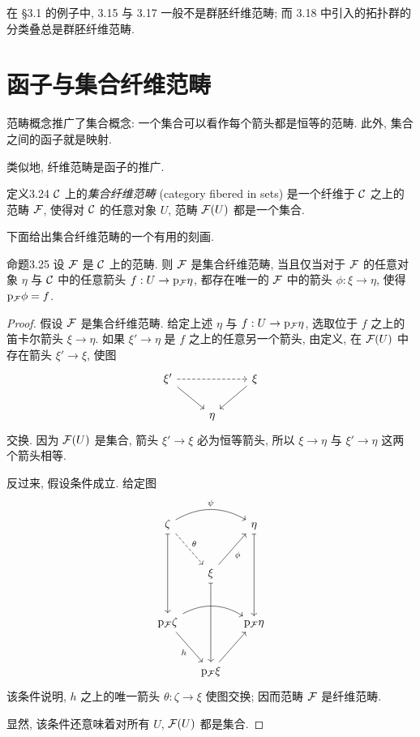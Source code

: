 在 \S3.1 的例子中, 3.15 与 3.17 一般不是群胚纤维范畴; 而 3.18 中引入的拓扑群的分类叠总是群胚纤维范畴.

\section{函子与集合纤维范畴}
\label{ch03:sec34}
范畴概念推广了集合概念: 一个集合可以看作每个箭头都是恒等的范畴. 此外, 集合之间的函子就是映射.

类似地, 纤维范畴是函子的推广.

\begin{origstatement}{定义}{3.24}\label{ch03:def324}
$\mathcal C$ 上的\emph{集合纤维范畴} (category fibered in sets) 是一个纤维于 $\mathcal C$ 之上的范畴 $\mathcal F$, 使得对 $\mathcal C$ 的任意对象 $U$, 范畴 $\mathcal F(U)$ 都是一个集合.
\end{origstatement}

下面给出集合纤维范畴的一个有用的刻画.

\begin{origstatement}{命题}{3.25}\label{ch03:prop325}
设 $\mathcal F$ 是 $\mathcal C$ 上的范畴. 则 $\mathcal F$ 是集合纤维范畴, 当且仅当对于 $\mathcal F$ 的任意对象 $\eta$ 与 $\mathcal C$ 中的任意箭头 $f:U\to\mathrm p_{\mathcal F}\eta$, 都存在唯一的 $\mathcal F$ 中的箭头 $\phi:\xi\to\eta$, 使得 $\mathrm p_{\mathcal F}\phi=f$.
\end{origstatement}
\begin{proof}
假设 $\mathcal F$ 是集合纤维范畴. 给定上述 $\eta$ 与 $f:U\to\mathrm p_{\mathcal F}\eta$, 选取位于 $f$ 之上的笛卡尔箭头 $\xi\to\eta$. 如果 $\xi'\to\eta$ 是 $f$ 之上的任意另一个箭头, 由定义, 在 $\mathcal F(U)$ 中存在箭头 $\xi'\to\xi$, 使图
\[
\begin{tikzcd}
\xi'\arrow[rr,dashed]\arrow[dr]&&\xi\arrow[dl]\\
&\eta&
\end{tikzcd}
\]
交换. 因为 $\mathcal F(U)$ 是集合, 箭头 $\xi'\to\xi$ 必为恒等箭头, 所以 $\xi\to\eta$ 与 $\xi'\to\eta$ 这两个箭头相等.

反过来, 假设条件成立. 给定图
\[
\begin{tikzcd}[column sep=small,row sep=large]
\zeta\arrow[rr,bend left,"{\psi}"]\arrow[dr,dashed,"{\theta}"]\arrow[dd,mapsto]&&\eta\arrow[dd,mapsto]\\
&\xi\arrow[ur,"{\phi}"']\arrow[dd,mapsto]&\\
\pF\zeta\arrow[rr,bend left]\arrow[dr,"{h}"']&&\pF\eta\\
&\pF\xi\arrow[ur]&
\end{tikzcd}
\]
该条件说明, $h$ 之上的唯一箭头 $\theta:\zeta\to\xi$ 使图交换; 因而范畴 $\mathcal F$ 是纤维范畴.

显然, 该条件还意味着对所有 $U$, $\mathcal F(U)$ 都是集合.
\end{proof}

